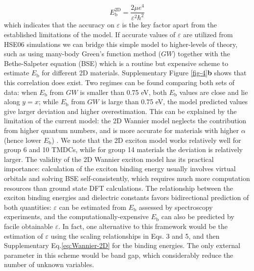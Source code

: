 \documentclass[journal=ancac3,manuscript=article,email=true,hyperref=true,keywords=true]{achemso}
\begin{document}
\begin{equation}
\label{eq:Wannier-2D}
E_{\mathrm{b}}^{\mathrm{2D}} = \frac{2 \mu e^4}{\varepsilon^2 \hbar^2 }
\end{equation}
which indicates that the accuracy on $\varepsilon$ is the key factor apart from the 
established limitations of the model. If accurate values of $\varepsilon$ are utilized
from HSE06 simulations we can bridge this simple model to 
higher-levels of theory, 
such as using many-body Green's function method ($GW$) together 
with the Bethe-Salpeter equation (BSE) which is a routine but expensive scheme to 
estimate \(E_{\mathrm{b}}\) for different 2D materials. Supplementary Figure \ref{fig-4}{\bf b} shows that this correlation does exist. 
Two regimes can be found comparing both sets of data: when
\(E_{\mathrm{b}}\) from $GW$ is smaller than 0.75 eV, both
\(E_{\mathrm{b}}\) values are close and lie along \(y=x\); while
\(E_{\mathrm{b}}\) from $GW$ is large than 0.75 eV, the model predicted
values give larger deviation and higher overestimation. This can be
explained by the limitation of the current model: the 2D Wannier model
neglects the contribution from higher quantum numbers, and is more
accurate for materials with higher \(\alpha\) (hence lower
\(E_{\mathrm{b}}\)) \cite{Olsen_2016_hydrogen}. We note that the 2D
exciton model works relatively well for group 6 and 10 TMDCs, while
for group 14 materials the deviation is relatively larger. The
validity of the 2D Wannier exciton model has its practical importance:
calculation of the exciton binding energy usually involves virtual
orbitals and solving BSE self-consistently, which requires much
more computation resources than ground state DFT calculations. The
relationship between the exciton binding energies and 
dielectric constants favors bidirectional
prediction of both quantities: \(\varepsilon\) can be estimated from \(E_{\mathrm{b}}\) assessed by
spectroscopy experiments, and the computationally-expensive
\(E_{\mathrm{b}}\) can also be predicted by facile obtainable \(\varepsilon\). 
In fact, one alternative to this framework 
would be the estimation of $\varepsilon$ using 
the scaling relationships in Eqs. 3 and 5, 
and then Supplementary Eq.\ref{eq:Wannier-2D} for the binding energies. The only external parameter 
in this scheme would be band gap, which considerably reduce the number of 
unknown variables.  
\end{document}
